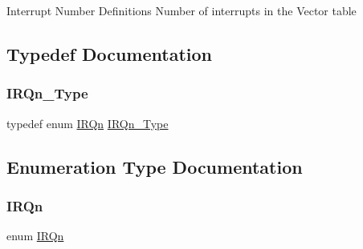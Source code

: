 Interrupt Number Definitions Number of interrupts in the Vector table 

\subsection{Typedef Documentation}
\mbox{\label{group___interrupt__vector__numbers_gac3af4a32370fb28c4ade8bf2add80251}} 
\subsubsection{\texorpdfstring{I\+R\+Qn\+\_\+\+Type}{IRQn\_Type}}
{\footnotesize\ttfamily typedef enum \mbox{\hyperlink{group___interrupt__vector__numbers_ga666eb0caeb12ec0e281415592ae89083}{I\+R\+Qn}}  \mbox{\hyperlink{group___interrupt__vector__numbers_gac3af4a32370fb28c4ade8bf2add80251}{I\+R\+Qn\+\_\+\+Type}}}



\subsection{Enumeration Type Documentation}
\mbox{\label{group___interrupt__vector__numbers_ga666eb0caeb12ec0e281415592ae89083}} 
\subsubsection{\texorpdfstring{I\+R\+Qn}{IRQn}}
{\footnotesize\ttfamily enum \mbox{\hyperlink{group___interrupt__vector__numbers_ga666eb0caeb12ec0e281415592ae89083}{I\+R\+Qn}}}

